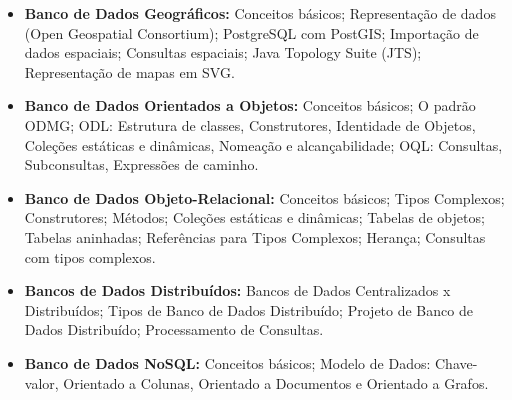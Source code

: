 \begin{itemize}

 \item \textbf{Banco de Dados Geográficos:} Conceitos básicos;	Representação de dados (Open Geospatial Consortium); PostgreSQL com PostGIS; Importação de dados espaciais; Consultas espaciais; Java Topology Suite (JTS); Representação de mapas em SVG.
 
 \item \textbf{Banco de Dados Orientados a Objetos:} Conceitos básicos; O padrão ODMG; ODL: Estrutura de classes, Construtores, Identidade de Objetos, Coleções estáticas e dinâmicas, Nomeação e alcançabilidade; OQL: Consultas, Subconsultas, Expressões de caminho.

 \item \textbf{Banco de Dados Objeto-Relacional:} Conceitos básicos; Tipos Complexos; Construtores;	Métodos; Coleções estáticas e dinâmicas; Tabelas de objetos; Tabelas aninhadas; Referências para Tipos Complexos; Herança; Consultas com tipos complexos.
 
 \item \textbf{Bancos de Dados Distribuídos:} Bancos de Dados Centralizados x Distribuídos; Tipos de Banco de Dados Distribuído; Projeto de Banco de Dados Distribuído; Processamento de Consultas.

\item \textbf{Banco de Dados NoSQL:} Conceitos básicos; Modelo de Dados: Chave-valor, Orientado a Colunas, Orientado a Documentos e Orientado a Grafos.

\end{itemize}




